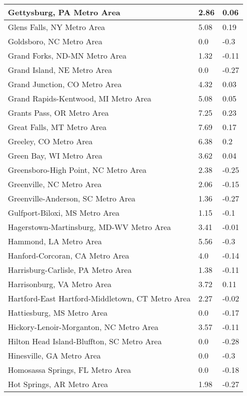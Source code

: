 \documentclass[12pt,oneside, letterpaper]{book}
\begin{document}
\begin{longtable}{| p{} | p{} | p{} |}
    Gettysburg, PA Metro Area & 2.86 & 0.06 \\ \hline
    Glens Falls, NY Metro Area & 5.08 & 0.19 \\ \hline
    Goldsboro, NC Metro Area & 0.0 & -0.3 \\ \hline
    Grand Forks, ND-MN Metro Area & 1.32 & -0.11 \\ \hline
    Grand Island, NE Metro Area & 0.0 & -0.27 \\ \hline
    Grand Junction, CO Metro Area & 4.32 & 0.03 \\ \hline
    Grand Rapids-Kentwood, MI Metro Area & 5.08 & 0.05 \\ \hline
    Grants Pass, OR Metro Area & 7.25 & 0.23 \\ \hline
    Great Falls, MT Metro Area & 7.69 & 0.17 \\ \hline
    Greeley, CO Metro Area & 6.38 & 0.2 \\ \hline
    Green Bay, WI Metro Area & 3.62 & 0.04 \\ \hline
    Greensboro-High Point, NC Metro Area & 2.38 & -0.25 \\ \hline
    Greenville, NC Metro Area & 2.06 & -0.15 \\ \hline
    Greenville-Anderson, SC Metro Area & 1.36 & -0.27 \\ \hline
    Gulfport-Biloxi, MS Metro Area & 1.15 & -0.1 \\ \hline
    Hagerstown-Martinsburg, MD-WV Metro Area & 3.41 & -0.01 \\ \hline
    Hammond, LA Metro Area & 5.56 & -0.3 \\ \hline
    Hanford-Corcoran, CA Metro Area & 4.0 & -0.14 \\ \hline
    Harrisburg-Carlisle, PA Metro Area & 1.38 & -0.11 \\ \hline
    Harrisonburg, VA Metro Area & 3.72 & 0.11 \\ \hline
    Hartford-East Hartford-Middletown, CT Metro Area & 2.27 & -0.02 \\ \hline
    Hattiesburg, MS Metro Area & 0.0 & -0.17 \\ \hline
    Hickory-Lenoir-Morganton, NC Metro Area & 3.57 & -0.11 \\ \hline
    Hilton Head Island-Bluffton, SC Metro Area & 0.0 & -0.28 \\ \hline
    Hinesville, GA Metro Area & 0.0 & -0.3 \\ \hline
    Homosassa Springs, FL Metro Area & 0.0 & -0.18 \\ \hline
    Hot Springs, AR Metro Area & 1.98 & -0.27 \\ \hline

\end{longtable}
\end{document}
